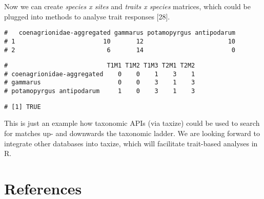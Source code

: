 Now we can create \emph{species x sites} and \emph{traits x species} matrices, which could be plugged into methods to analyse trait responses [28].


\begin{knitrout}
\color{fgcolor}\small\begin{kframe}
\begin{alltt}
\hlopt{$} \hlkwb{<-} \hlopt{$}\hlstd{traits[}\hlstd{(}\hlopt{$}\hlopt{$}\hlstd{taxon)]}
 \hlkwb{<-}  \hlopt{~}    
           \hlstd{=} \hlstd{)}
 \hlkwb{<-} \hlopt{$}
\hlopt{$} \hlkwb{<-} 
\end{alltt}
\begin{verbatim}
#   coenagrionidae-aggregated gammarus potamopyrgus antipodarum
# 1                        10       12                       10
# 2                         6       14                        0
\end{verbatim}
\begin{alltt}
 \hlkwb{<-} \hlstd{traits[,} \hlopt{:}\hlstd{][}\hlstd{(}\hlopt{$}\hlstd{taxon_cleaned), ]}
 \hlkwb{<-} \hlopt{$}
\hlopt{$} \hlkwb{<-} 
\end{alltt}
\begin{verbatim}
#                           T1M1 T1M2 T1M3 T2M1 T2M2
# coenagrionidae-aggregated    0    0    1    3    1
# gammarus                     0    0    3    1    3
# potamopyrgus antipodarum     1    0    3    1    3
\end{verbatim}
\begin{alltt}
\hlstd{(} \hlopt{==} 
\end{alltt}
\begin{verbatim}
# [1] TRUE
\end{verbatim}
\end{kframe}
\end{knitrout}


This is just an example how taxonomic APIs (via taxize) could be used to search for matches up- and downwards the taxonomic ladder. We are looking forward to integrate other databases into taxize, which will facilitate trait-based analyses in R.


\clearpage
\section{References}
\printbibliography[heading=none]
